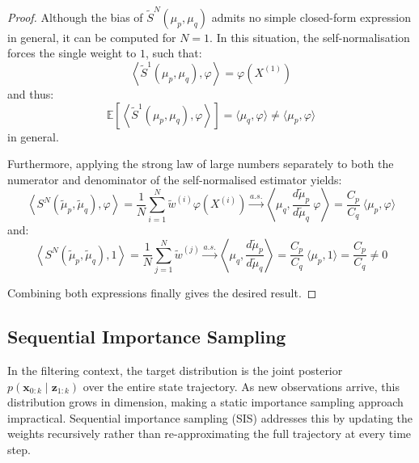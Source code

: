 \begin{proof}
	Although the bias of $\tilde{S}^N(\mu_p,\mu_q)$ admits no simple closed-form expression in general, it can be computed for $N=1$. In this situation, the self-normalisation forces the single weight to $1$, such that:
	\begin{equation}
		\left\langle\tilde{S}^1(\mu_p,\mu_q),\varphi\right\rangle=\varphi\left(X^{(1)}\right)
	\end{equation}
	and thus:
	\begin{equation}
		\mathbb{E}\left[\left\langle\tilde{S}^1(\mu_p,\mu_q),\varphi\right\rangle\right]=\langle\mu_q,\varphi\rangle\neq\langle\mu_p,\varphi\rangle
	\end{equation}
	in general.

	Furthermore, applying the strong law of large numbers separately to both the numerator and denominator of the self-normalised estimator yields:
	\begin{equation}
		\left\langle S^N(\tilde{\mu}_p,\tilde{\mu}_q),\varphi\right\rangle=\frac{1}{N}\sum_{i=1}^N\tilde{w}^{(i)}\varphi\left(X^{(i)}\right)\overset{a.s.}{\longrightarrow}\left\langle\mu_q,\frac{d\tilde{\mu}_p}{d\tilde{\mu}_q}\:\varphi\right\rangle=\frac{C_p}{C_q}\:\langle\mu_p,\varphi\rangle
	\end{equation}
	and:
	\begin{equation}
		\left\langle S^N(\tilde{\mu}_p,\tilde{\mu}_q),1\right\rangle=\frac{1}{N}\sum_{j=1}^N\tilde{w}^{(j)}\overset{a.s.}{\longrightarrow}\left\langle\mu_q,\frac{d\tilde{\mu}_p}{d\tilde{\mu}_q}\right\rangle=\frac{C_p}{C_q}\:\langle\mu_p,1\rangle=\frac{C_p}{C_q}\neq0
	\end{equation}

	Combining both expressions finally gives the desired result.
\end{proof}

\subsection{Sequential Importance Sampling}

In the filtering context, the target distribution is the joint posterior $p(\mathbf{x}_{0:k}\mid\mathbf{z}_{1:k})$ over the entire state trajectory. As new observations arrive, this distribution grows in dimension, making a static importance sampling approach impractical. Sequential importance sampling (SIS) \cite{bib:SMC-Bayesian,bib:intro-SMC} addresses this by updating the weights recursively rather than re-approximating the full trajectory at every time step.

